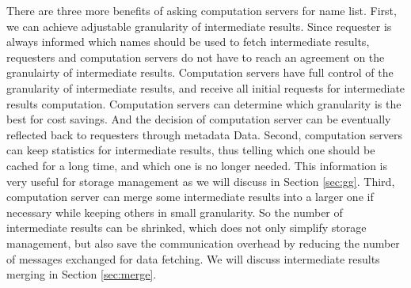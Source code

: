 There are three more benefits of asking computation servers for name list.  
First, we can achieve adjustable granularity of intermediate results. 
Since requester is always informed which names should be used to fetch intermediate results, requesters and computation servers do not have to reach an agreement on the granulairty of intermediate results.
Computation servers have full control of the granularity of intermediate results, and receive all initial requests for intermediate results computation. 
Computation servers can determine which granularity is the best for cost savings. 
And the decision of computation server can be eventually reflected back to requesters through metadata {\sc Data}.
Second, computation servers can keep statistics for intermediate results, thus telling which one should be cached for a long time, and which one is no longer needed. 
This information is very useful for storage management as we will discuss in Section \ref{sec:gg}.
Third, computation server can merge some intermediate results into a larger one if necessary while keeping others in small granularity.
So the number of intermediate results can be shrinked, which does not only simplify storage management, but also save the communication overhead by reducing the number of messages exchanged for data fetching.
We will discuss intermediate results merging in Section \ref{sec:merge}.
